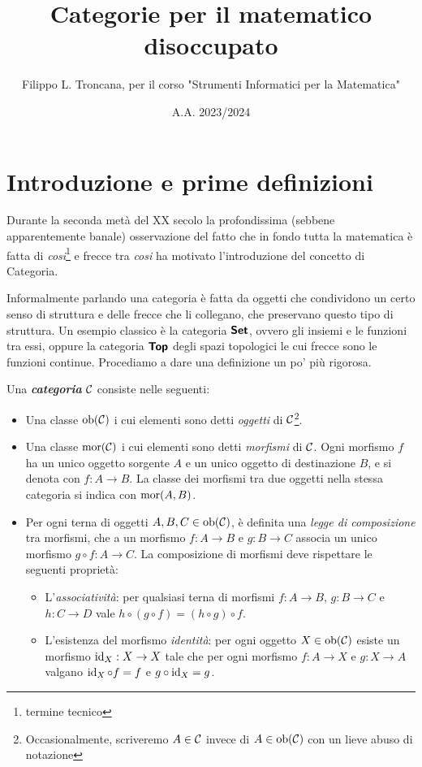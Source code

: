 \documentclass{article}
\title{Categorie per il matematico disoccupato}
\author{Filippo L. Troncana, per il corso "Strumenti Informatici per la Matematica"}
\date{A.A. 2023/2024}
\begin{document}
\nocite{*}
\maketitle

\section{Introduzione e prime definizioni}
\label{sec:Intro}

Durante la seconda metà del XX secolo la profondissima (sebbene apparentemente banale) osservazione del fatto che in fondo tutta la matematica è fatta di \textit{cosi}\footnote{termine tecnico} e frecce tra \textit{cosi} ha motivato l'introduzione del concetto di Categoria.

Informalmente parlando una categoria è fatta da oggetti che condividono un certo senso di struttura e delle frecce che li collegano, che preservano questo tipo di struttura. Un esempio classico è la categoria $\text{\sffamily\textbf{Set}}$, ovvero gli insiemi e le funzioni tra essi, oppure la categoria $\text{\sffamily\textbf{Top}}$ degli spazi topologici le cui frecce sono le funzioni continue. Procediamo a dare una definizione un po' più rigorosa.

\begin{definition}
    Una \emph{\textbf{categoria}} $\mathcal{C}$ consiste nelle seguenti:
    \begin{itemize}
        \item Una classe $\operatorname{ob}(\mathcal{C})$ i cui elementi sono detti \emph{oggetti} di $\mathcal{C}$\footnote{Occasionalmente, scriveremo $A\in \mathcal{C}$ invece di $A \in \operatorname{ob}(\mathcal{C})$ con un lieve abuso di notazione}.
        \item Una classe $\operatorname{mor}(\mathcal{C})$ i cui elementi sono detti \emph{morfismi} di $\mathcal{C}$. Ogni morfismo $f$ ha un unico oggetto sorgente $A$ e un unico oggetto di destinazione $B$, e si denota con $f:A\to B$. La classe dei morfismi tra due oggetti nella stessa categoria si indica con $\operatorname{mor}(A,B)$.
        \item Per ogni terna di oggetti $A,B,C \in \operatorname{ob}(\mathcal{C})$, è definita una \emph{legge di composizione} tra morfismi, che a un morfismo $f : A \to B$ e $g: B \to C$ associa un unico morfismo $g \circ f : A \to C$. La composizione di morfismi deve rispettare le seguenti proprietà:
        \begin{itemize}
            \item L'\emph{associatività}: per qualsiasi terna di morfismi $f: A\to B$, $g: B\to C$ e $h:C \to D$ vale $h \circ (g \circ f) = (h \circ g) \circ f$.
            \item L'esistenza del morfismo \emph{identità}: per ogni oggetto $X \in \operatorname{ob}(\mathcal{C})$ esiste un morfismo $\operatorname{id}_{X} : X \to X$ tale che per ogni morfismo $f:A \to X$ e $g: X \to A$ valgano $\operatorname{id}_{X} \circ f = f$ e $g \circ \operatorname{id}_{X} = g$.
        \end{itemize}
    \end{itemize}
\end{definition}
\end{document}

